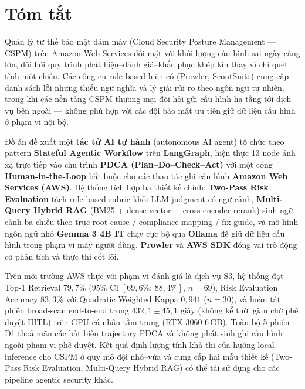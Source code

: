 \chapter*{Tóm tắt}
Quản lý tư thế bảo mật đám mây (Cloud Security Posture Management --- CSPM) trên Amazon Web Services đối mặt với khối lượng cấu hình sai ngày càng lớn, đòi hỏi quy trình phát hiện--đánh giá--khắc phục khép kín thay vì chỉ quét tĩnh một chiều. Các công cụ rule-based hiện có (Prowler, ScoutSuite) cung cấp danh sách lỗi nhưng thiếu ngữ nghĩa và lý giải rủi ro theo ngôn ngữ tự nhiên, trong khi các nền tảng CSPM thương mại đòi hỏi gửi cấu hình hạ tầng tới dịch vụ bên ngoài --- không phù hợp với các đội bảo mật ưu tiên giữ dữ liệu cấu hình ở phạm vi nội bộ.

Đồ án đề xuất một \textbf{tác tử AI tự hành} (autonomous AI agent) tổ chức theo pattern \textbf{Stateful Agentic Workflow} trên \textbf{LangGraph}, hiện thực 13 node ánh xạ trực tiếp vào chu trình \textbf{PDCA (Plan--Do--Check--Act)} với một cổng \textbf{Human-in-the-Loop} bắt buộc cho các thao tác ghi cấu hình \textbf{Amazon Web Services (AWS)}. Hệ thống tích hợp ba thiết kế chính: \textbf{Two-Pass Risk Evaluation} tách rule-based rubric khỏi LLM judgment có ngữ cảnh, \textbf{Multi-Query Hybrid RAG} (BM25 + dense vector + cross-encoder rerank) sinh ngữ cảnh ba chiều theo trục root-cause / compliance mapping / fix-guide, và mô hình ngôn ngữ nhỏ \textbf{Gemma 3 4B IT} chạy cục bộ qua \textbf{Ollama} để giữ dữ liệu cấu hình trong phạm vi máy người dùng. \textbf{Prowler} và \textbf{AWS SDK} đóng vai trò động cơ phân tích và thực thi cốt lõi.

Trên môi trường AWS thực với phạm vi đánh giá là dịch vụ S3, hệ thống đạt Top-1 Retrieval $79{,}7\%$ ($95\%$ CI $[69{,}6\%;\,88{,}4\%]$, $n=69$), Risk Evaluation Accuracy $83{,}3\%$ với Quadratic Weighted Kappa $0{,}941$ ($n=30$), và hoàn tất phiên broad-scan end-to-end trong $432{,}1 \pm 45{,}1$ giây (không kể thời gian chờ phê duyệt HITL) trên GPU cá nhân tầm trung (RTX 3060 6\,GB). Toàn bộ 5 phiên D1 thoả mãn các bất biến trajectory PDCA và không phát sinh ghi cấu hình ngoài phạm vi phê duyệt. Kết quả định lượng tính khả thi của hướng local-inference cho CSPM ở quy mô đội nhỏ--vừa và cung cấp hai mẫu thiết kế (Two-Pass Risk Evaluation, Multi-Query Hybrid RAG) có thể tái sử dụng cho các pipeline agentic security khác.

